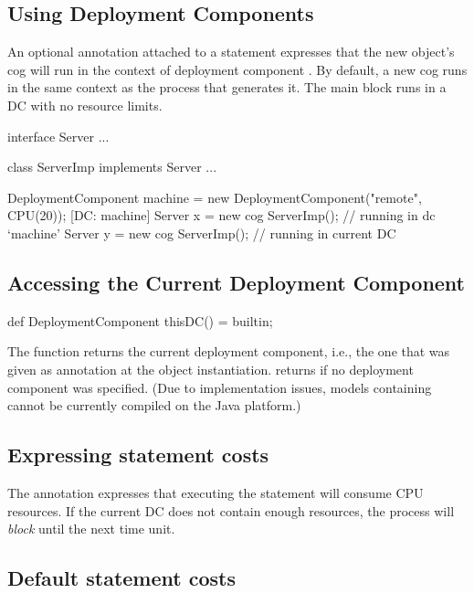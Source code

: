 \subsection{Using Deployment Components}

   An optional annotation \absinline{[DC: x]} attached to a 
   statement expresses that the new object's cog will run in the context
   of deployment component .  By default, a new cog runs in the
   same context as the process that generates it.  The main block runs
   in a DC with no resource limits.

\begin{absexample} 
interface Server { ... }

class ServerImp implements Server { ... }

{
  DeploymentComponent machine = new DeploymentComponent("remote",
      CPU(20));
  [DC: machine] Server x = new cog ServerImp();  // running in dc `machine'
  Server y = new cog ServerImp();                // running in current DC
}
\end{absexample} 

\subsection{Accessing the Current Deployment Component}

\begin{absexample} 
def DeploymentComponent thisDC() = builtin;
\end{absexample} 

   The  function returns the current deployment
   component, i.e., the one that was given as annotation at the  object instantiation.   returns  if no
   deployment component was specified.  (Due to implementation issues,
   models containing  cannot be currently compiled on the
   Java platform.)

\subsection{Expressing statement costs}

   The annotation  expresses that executing the
   statement  will consume  CPU resources.  If the current
   DC does not contain enough resources, the process will \emph{block} until
   the next time unit.

\subsection{Default statement costs}

